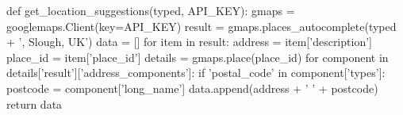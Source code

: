 def get_location_suggestions(typed, API_KEY):
    gmaps = googlemaps.Client(key=API_KEY)
    result = gmaps.places_autocomplete(typed + ', Slough, UK')
    data = []
    for item in result:
        address = item['description']
        place_id = item['place_id']
        details = gmaps.place(place_id)
        for component in details['result']['address_components']:
            if 'postal_code' in component['types']:
                postcode = component['long_name']
                data.append(address + ' ' + postcode)
    return data
